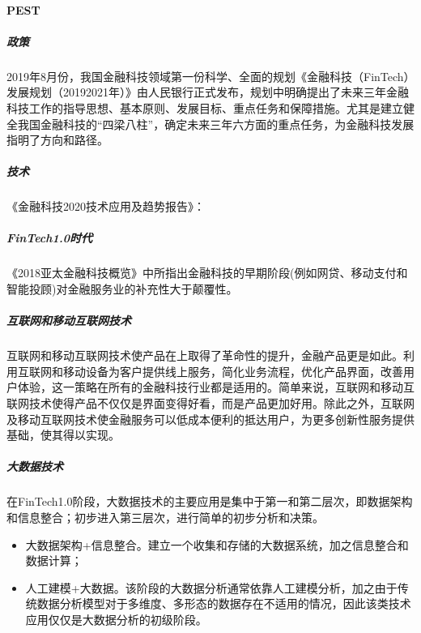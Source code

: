 \documentclass[letterpaper,10pt,english]{sphinxmanual}
\begin{document}
\paragraph{PEST}
\label{\detokenize{chapter_AI+Finance/FinTech:pest}}

\subparagraph{政策}
\label{\detokenize{chapter_AI+Finance/FinTech:id8}}
2019年8月份，我国金融科技领域第一份科学、全面的规划《金融科技（FinTech）发展规划（2019\sphinxhyphen{}2021年）》由人民银行正式发布，规划中明确提出了未来三年金融科技工作的指导思想、基本原则、发展目标、重点任务和保障措施。尤其是建立健全我国金融科技的“四梁八柱”，确定未来三年六方面的重点任务，为金融科技发展指明了方向和路径。%
\begin{footnote}[1095]\sphinxAtStartFootnote
{}
%
\end{footnote}


\subparagraph{技术}
\label{\detokenize{chapter_AI+Finance/FinTech:id9}}
《金融科技2020技术应用及趋势报告》：


\subparagraph{FinTech1.0时代}
\label{\detokenize{chapter_AI+Finance/FinTech:fintech1-0}}
《2018亚太金融科技概览》中所指出金融科技的早期阶段(例如网贷、移动支付和智能投顾)对金融服务业的补充性大于颠覆性。


\subparagraph{互联网和移动互联网技术}
\label{\detokenize{chapter_AI+Finance/FinTech:id10}}
互联网和移动互联网技术使产品在上取得了革命性的提升，金融产品更是如此。利用互联网和移动设备为客户提供线上服务，简化业务流程，优化产品界面，改善用户体验，这一策略在所有的金融科技行业都是适用的。简单来说，互联网和移动互联网技术使得产品不仅仅是界面变得好看，而是产品更加好用。除此之外，互联网及移动互联网技术使金融服务可以低成本便利的抵达用户，为更多创新性服务提供基础，使其得以实现。


\subparagraph{大数据技术}
\label{\detokenize{chapter_AI+Finance/FinTech:id11}}
在FinTech1.0阶段，大数据技术的主要应用是集中于第一和第二层次，即数据架构和信息整合；初步进入第三层次，进行简单的初步分析和决策。
\begin{itemize}
\item {} 
大数据架构+信息整合。建立一个收集和存储的大数据系统，加之信息整合和数据计算；

\item {} 
人工建模+大数据。该阶段的大数据分析通常依靠人工建模分析，加之由于传统数据分析模型对于多维度、多形态的数据存在不适用的情况，因此该类技术应用仅仅是大数据分析的初级阶段。

\end{itemize}
\end{document}
